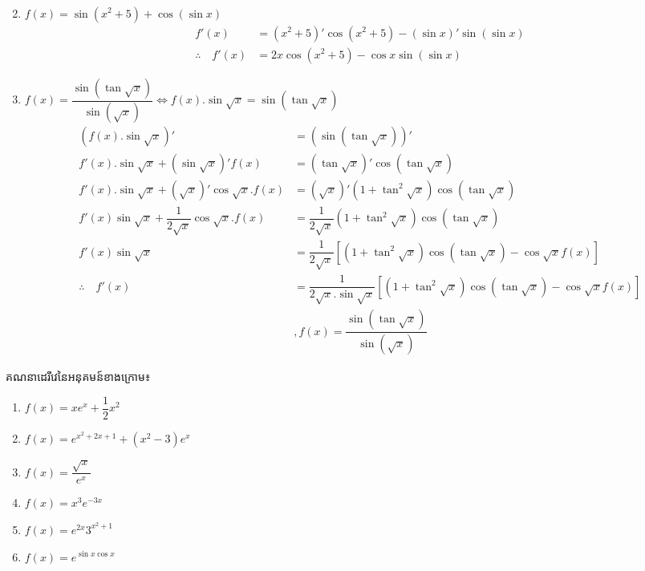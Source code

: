 \documentclass[a4paper,12pt]{article}
\begin{document}
\begin{enumerate}
\begin{align*}
	      \end{align*}
	\item $f(x)=\sin (x^2+5)+\cos (\sin x)$
	      \begin{align*}
		      f'(x)                  & =(x^2+5)'\cos (x^2+5)-(\sin x)'\sin (\sin x) \\
		      \therefore \quad f'(x) & =2x\cos (x^2+5)-\cos x\sin (\sin x)
	      \end{align*}
	\item $f(x)=\dfrac{\sin (\tan \sqrt{x})}{\sin (\sqrt{x})}\Longleftrightarrow f(x).\sin \sqrt{x}=\sin (\tan \sqrt{x})$
	      \begin{align*}
		      \left(f(x).\sin \sqrt{x}\right)'                          & =\left(\sin (\tan \sqrt{x})\right)'                                                                         \\
		      f'(x).\sin \sqrt{x}+(\sin \sqrt{x})'f(x)                  & =(\tan \sqrt{x})'\cos (\tan \sqrt{x})                                                                       \\
		      f'(x).\sin \sqrt{x} +(\sqrt{x})'\cos \sqrt{x}.f(x)        & =(\sqrt{x})'(1+\tan^2 \sqrt{x})\cos (\tan \sqrt{x})                                                         \\
		      f'(x)\sin \sqrt{x}+\dfrac{1}{2\sqrt{x}}\cos \sqrt{x}.f(x) & =\dfrac{1}{2\sqrt{x}}(1+\tan^2 \sqrt{x})\cos (\tan \sqrt{x})                                                \\
		      f'(x)\sin \sqrt{x}                                        & =\dfrac{1}{2\sqrt{x}}\left[(1+\tan^2 \sqrt{x})\cos (\tan \sqrt{x})-\cos \sqrt{x}f(x)  \right]               \\
		      \therefore \quad f'(x)                                    & =\dfrac{1}{2\sqrt{x}.\sin \sqrt{x}}\left[(1+\tan^2 \sqrt{x})\cos (\tan \sqrt{x})-\cos \sqrt{x}f(x)  \right] \\
		                                                                & ,f(x)=\dfrac{\sin (\tan \sqrt{x})}{\sin (\sqrt{x})}
	      \end{align*}
\end{enumerate}
\begin{exercise}
	គណនាដេរីវេនៃអនុគមន៍ខាងក្រោម៖
	\begin{multicols}{2}
		\begin{enumerate}
			\item $f(x)=xe^x +\dfrac{1}{2}x^2$
			\item $f(x)=e^{x^2+2x+1}+(x^2-3)e^x$
			\item $f(x)=\dfrac{\sqrt{x}}{e^x}$
			\item $f(x)=x^3 e^{-3x}$
			\item $f(x)=e^{2x}3^{x^2+1}$
			\item $f(x)=e^{\sin x\cos x}$
		\end{enumerate}
	\end{multicols}
\end{exercise}
\end{document}

